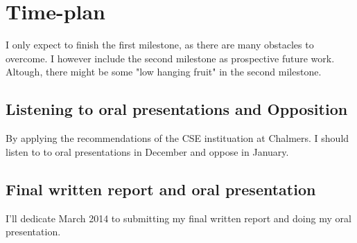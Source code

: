 \section{Time-plan}

I only expect to finish the first milestone, as there are many obstacles to
overcome. I however include the second milestone as prospective future work.
Altough, there might be some "low hanging fruit" in the second milestone.


\subsection{Listening to oral presentations and Opposition}

By applying the recommendations of the CSE instituation at Chalmers. I should
listen to to oral presentations in December and oppose in January.

\subsection{Final written report and oral presentation}

I'll dedicate March 2014 to submitting my final written report and doing my oral
presentation.
